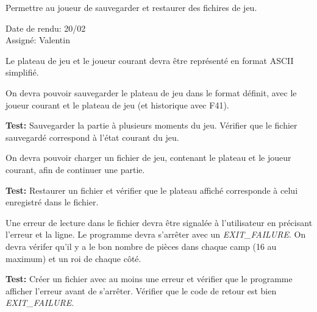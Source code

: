 \documentclass{article}
\begin{document}
\begin{nonfunctionnalneedbox}
    Permettre au joueur de sauvegarder et restaurer des fichires de jeu.
    \begin{duedatebox}
        Date de rendu: 20/02\\
        Assigné: Valentin
    \end{duedatebox}
    \begin{subneedbox}
        Le plateau de jeu et le joueur courant devra être représenté en format ASCII simplifié.
    \end{subneedbox}
    \begin{subneedbox}
        On devra pouvoir sauvegarder le plateau de jeu dans le format définit, avec le joueur
         courant et le plateau de jeu (et historique avec F41).

        \textbf{Test:} Sauvegarder la partie à plusieurs moments du jeu. Vérifier que le fichier sauvegardé
        correspond à l'état courant du jeu.
    \end{subneedbox}
    \begin{subneedbox}
        On devra pouvoir charger un fichier de jeu, contenant le plateau et le joueur courant,
        afin de continuer une partie.

        \textbf{Test:} Restaurer un fichier et vérifier que le plateau affiché corresponde à celui
        enregistré dans le fichier.
    \end{subneedbox}
    \begin{subneedbox}
        Une erreur de lecture dans le fichier devra être signalée à l'utilisateur en précisant l'erreur et
        la ligne. Le programme devra s'arrêter avec un \textit{EXIT\_FAILURE}. On devra vérifer qu'il y a
        le bon nombre de pièces dans chaque camp (16 au maximum) et un roi de chaque côté.

        \textbf{Test:} Créer un fichier avec au moins une erreur et vérifier que le programme afficher l'erreur
        avant de s'arrêter. Vérifier que le code de retour est bien \textit{EXIT\_FAILURE}.
    \end{subneedbox}

\end{nonfunctionnalneedbox}
\end{document}
